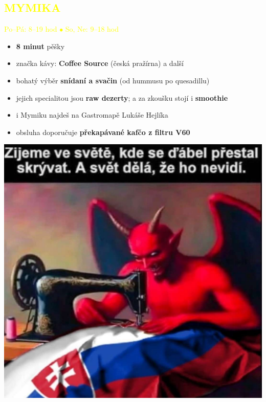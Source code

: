 \documentclass{article}
\newcommand{\podnadpisy}[1]{
  \subsection*{\textcolor{yellow}{#1}}
}
\begin{document}
\pagebreak
\noindent
\begin{minipage}{0.7\textwidth}
  \podnadpisy{MYMIKA}
  \textcolor{yellow}{Po--Pá: 8--19 hod $\bullet$ So, Ne: 9--18 hod}
  \small
  \begin{itemize}[leftmargin=10pt]
    \item \textbf{8 minut} pěšky
    \item značka kávy: \textbf{Coffee Source} (česká pražírna) a další
    \item bohatý výběr \textbf{snídaní a svačin} (od hummusu po quesadillu)
    \item jejich specialitou jsou \textbf{raw dezerty}; a za zkoušku stojí i \textbf{smoothie} 
    \item i Mymiku najdeš na Gastromapě Lukáše Hejlíka
    \item obsluha doporučuje \textbf{překapávané kafčo z filtru V60}
  \end{itemize}
\end{minipage}
\hfill
\begin{minipage}{0.27\textwidth}
  \includegraphics[width=\linewidth]{dulezite.jpg}
\end{minipage}
\end{document}
